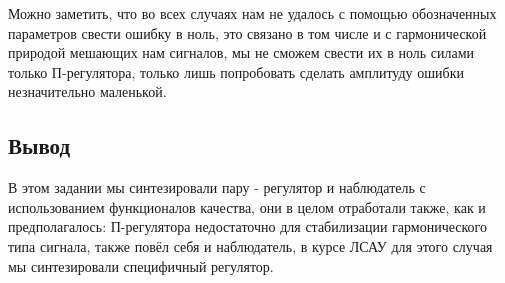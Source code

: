 Можно заметить, что во всех случаях нам не удалось с помощью обозначенных параметров свести ошибку в ноль, это связано в том числе и с гармонической природой мешающих нам сигналов, 
мы не сможем свести их в ноль силами только П-регулятора, только лишь попробовать сделать амплитуду ошибки незначительно маленькой.

\subsection{Вывод}
В этом задании мы синтезировали  пару - регулятор и наблюдатель с использованием функционалов качества, они в целом отработали также, как и предполагалось: 
П-регулятора недостаточно для стабилизации гармонического типа сигнала, также повёл себя и наблюдатель, в курсе ЛСАУ для этого случая мы синтезировали специфичный регулятор.

\endinput